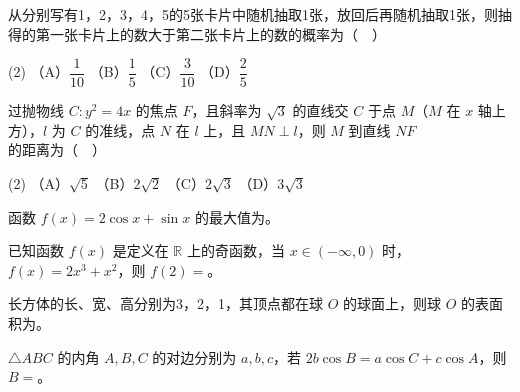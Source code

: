 \begin{question}
从分别写有1，2，3，4，5的5张卡片中随机抽取1张，放回后再随机抽取1张，则抽得的第一张卡片上的数大于第二张卡片上的数的概率为（　）

\begin{gkopts}(2)
\task （A）\(\dfrac{1}{10}\)
\task （B）\(\dfrac{1}{5}\)
\task （C）\(\dfrac{3}{10}\)
\task （D）\(\dfrac{2}{5}\)
\end{gkopts}

\end{question}
\begin{question}
过抛物线 \(C:y^2=4x\) 的焦点 \(F\)，且斜率为 \(\sqrt3\) 的直线交 \(C\) 于点 \(M\)（\(M\) 在 \(x\) 轴上方），\(l\) 为 \(C\) 的准线，点 \(N\) 在 \(l\) 上，且 \(MN\perp l\)，则 \(M\) 到直线 \(NF\) 的距离为（　）

\begin{gkopts}(2)
\task （A）\(\sqrt5\)
\task （B）\(2\sqrt2\)
\task （C）\(2\sqrt3\)
\task （D）\(3\sqrt3\)
\end{gkopts}

\end{question}

\begin{question}
函数 \(f(x)=2\cos x+\sin x\) 的最大值为\gkblank{}。

\end{question}
\begin{question}
已知函数 \(f(x)\) 是定义在 \(\mathbb R\) 上的奇函数，当 \(x\in(-\infty,0)\) 时，\(f(x)=2x^3+x^2\)，则 \(f(2)=\)\gkblank{}。

\end{question}
\begin{question}
长方体的长、宽、高分别为3，2，1，其顶点都在球 \(O\) 的球面上，则球 \(O\) 的表面积为\gkblank{}。

\end{question}
\begin{question}
\(\triangle ABC\) 的内角 \(A,B,C\) 的对边分别为 \(a,b,c\)，若 \(2b\cos B=a\cos C+c\cos A\)，则 \(B=\)\gkblank{}。

\end{question}


